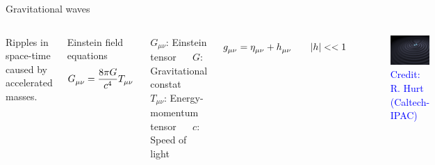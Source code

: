 \documentclass[pdf]{beamer}
\newcommand{\credit}[1]{\tiny{\textcolor{blue}{Credit: #1}}}
\begin{document}
\begin{frame}{Gravitational waves}
 \begin{columns}
 	\hspace{.5cm}
    Ripples in space-time caused by accelerated masses.
        
	
	\begin{block}{Einstein field equations}
	\begin{equation*}
    \tensor{G}{_\mu_\nu} = \dfrac{8\pi G}{c^4} \tensor{T}{_\mu_\nu}  
    \end{equation*}
	\end{block}
	\begin{tiny}
	$G_{\mu\nu}$: Einstein tensor $\quad$ $G$: Gravitational constat \\
	$T_{\mu\nu}$: Energy-momentum tensor $\quad$ $c$: Speed of light
	\end{tiny}
	
	
    \begin{equation*}
    \tensor{g}{_\mu_\nu} = \tensor{\eta}{_\mu_\nu} + \tensor{h}{_\mu_\nu} \qquad |h|<<1 
    \end{equation*}
    
    
    \begin{figure}
    \includegraphics[scale=.14]{fig/GravWave.jpg}
    \caption*{\credit{R. Hurt (Caltech-IPAC)}}
    \end{figure}
  \end{columns}

\end{frame}
\end{document}
